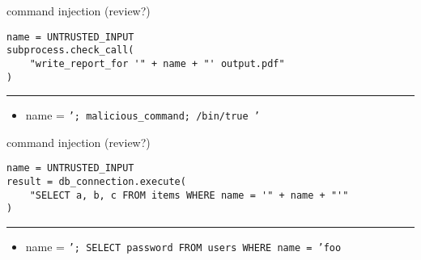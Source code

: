 \begin{frame}[fragile]{command injection (review?)}
\begin{Verbatim}[fontsize=\small]
name = UNTRUSTED_INPUT
subprocess.check_call(
    "write_report_for '" + name + "' output.pdf"
)
\end{Verbatim}
\hrule
\begin{itemize}
\item name = \texttt{'; malicious\_command; /bin/true '}
\end{itemize}
\end{frame}

\begin{frame}[fragile]{command injection (review?)}
\begin{Verbatim}[fontsize=\small]
name = UNTRUSTED_INPUT
result = db_connection.execute(
    "SELECT a, b, c FROM items WHERE name = '" + name + "'"
)
\end{Verbatim}
\hrule
\begin{itemize}
\item name = \texttt{'; SELECT password FROM users WHERE name = 'foo}
\end{itemize}
\end{frame}

